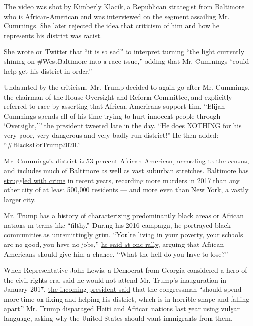 The video was shot by Kimberly Klacik, a Republican strategist from
Baltimore who is African-American and was interviewed on the segment
assailing Mr. Cummings. She later rejected the idea that criticism of
him and how he represents his district was racist.

\href{https://twitter.com/kimKBaltimore/status/1155154116412366848}{She
wrote on Twitter} that ``it is so sad'' to interpret turning ``the light
currently shining on \#WestBaltimore into a race issue,'' adding that
Mr. Cummings ``could help get his district in order.''

Undaunted by the criticism, Mr. Trump decided to again go after Mr.
Cummings, the chairman of the House Oversight and Reform Committee, and
explicitly referred to race by asserting that African-Americans support
him. ``Elijah Cummings spends all of his time trying to hurt innocent
people through `Oversight,'''
\href{https://twitter.com/realDonaldTrump/status/1155230324374343688}{the
president tweeted late in the day}. ``He does NOTHING for his very poor,
very dangerous and very badly run district!'' He then added:
``\#BlacksForTrump2020.''

Mr. Cummings's district is 53 percent African-American, according to the
census, and includes much of Baltimore as well as vast suburban
stretches.
\href{https://www.nytimes3xbfgragh.onion/2019/03/12/magazine/baltimore-tragedy-crime.html}{Baltimore
has struggled with crime} in recent years, recording more murders in
2017 than any other city of at least 500,000 residents --- and more even
than New York, a vastly larger city.

Mr. Trump has a history of characterizing predominantly black areas or
African nations in terms like ``filthy.'' During his 2016 campaign, he
portrayed black communities as unremittingly grim. ``You're living in
your poverty, your schools are no good, you have no jobs,''
\href{https://www.nytimes3xbfgragh.onion/2016/08/25/us/politics/donald-trump-black-voters.html}{he
said at one rally}, arguing that African-Americans should give him a
chance. ``What the hell do you have to lose?''

When Representative John Lewis, a Democrat from Georgia considered a
hero of the civil rights era, said he would not attend Mr. Trump's
inauguration in January 2017,
\href{https://twitter.com/realDonaldTrump/status/820251730407473153?ref_src=twsrc\%5Etfw\%7Ctwcamp\%5Etweetembed\%7Ctwterm\%5E820251730407473153\&ref_url=https\%3A\%2F\%2Ftwitframe.com\%2Fshow\%3Furl\%3Dhttps\%3A\%2F\%2Ftwitter.com\%2FrealDonaldTrump\%2Fstatus\%2F820251730407473153}{the
incoming president said} that the congressman ``should spend more time
on fixing and helping his district, which is in horrible shape and
falling apart.'' Mr. Trump
\href{https://www.nytimes3xbfgragh.onion/2018/01/11/us/politics/trump-shithole-countries.html}{disparaged
Haiti and African nations} last year using vulgar language, asking why
the United States should want immigrants from them.

